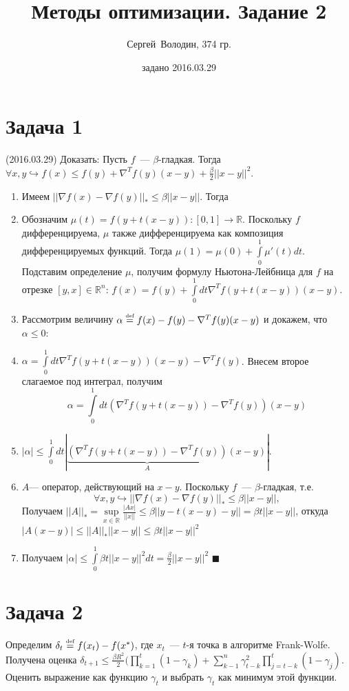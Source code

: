 \documentclass[a4paper]{article}
\title{Методы оптимизации. Задание 2}
\date{задано 2016.03.29}
\author{Сергей~Володин, 374 гр.}
\def\eqdef{\overset{\mbox{\tiny def}}{=}}
\begin{document}
\maketitle
\section*{Задача 1}
(2016.03.29)
Доказать: Пусть $f$~--- $\beta$-гладкая. Тогда $\forall x,y \hookrightarrow f(x)\leqslant f(y)+\nabla^Tf(y)(x-y)+\frac{\beta}{2}||x-y||^2$.

\begin{enumerate}
	\item Имеем $||\nabla f(x)-\nabla f(y)||_*\leqslant \beta ||x-y||$. Тогда 
	\item Обозначим $\mu(t)=f(y+t(x-y))\colon [0,1]\to\mathbb{R}$. Поскольку $f$ дифференцируема, $\mu$ также дифференцируема как композиция дифференцируемых функций. Тогда $\mu(1)=\mu(0)+\int\limits_0^1\mu'(t)dt$. Подставим определение $\mu$, получим формулу Ньютона-Лейбница для $f$ на отрезке $[y,x]\in\mathbb{R}^n$: $f(x)=f(y)+\int\limits_0^1 dt \nabla^Tf(y+t(x-y))(x-y)$.
	\item Рассмотрим величину $\alpha\eqdef f(x)-f(y)-\nabla^Tf(y)(x-y)$ и докажем, что $\alpha\leqslant 0$:
	\item $\alpha=\int\limits_0^1 dt \nabla^Tf(y+t(x-y))(x-y)-\nabla^Tf(y)$. Внесем второе слагаемое под интеграл, получим
	$$\alpha=\int\limits_0^1 dt \left(\nabla^T f(y+t(x-y))-\nabla^T f(y)\right)(x-y)$$
	\item $|\alpha|\leqslant\int\limits_0^1 dt |\underbrace{\left(\nabla^T f(y+t(x-y))-\nabla^T f(y)\right)}_{A}(x-y)|$.
	\item $A$--- оператор, действующий на $x-y$. Поскольку $f$~--- $\beta$-гладкая, т.е. $$\forall x,y\hookrightarrow ||\nabla f(x) - \nabla f(y)||_*\leqslant \beta ||x-y||,$$
	Получаем $||A||_*=\sup\limits_{x\in\mathbb{R}}\frac{|Ax|}{||x||}\leqslant \beta ||y-t(x-y)-y||=\beta t ||x-y||$, откуда $|A(x-y)|\leqslant ||A||_*||x-y||\leqslant \beta t||x-y||^2$
	\item Получаем $|\alpha|\leqslant \int\limits_0^1 \beta t ||x-y||^2 dt = \frac{\beta}{2}||x-y||^2$ $\blacksquare$
\end{enumerate}
\section*{Задача 2}
Определим $\delta_t\eqdef f(x_t)-f(x^*)$, где $x_t$~--- $t$-я точка в алгоритме Frank-Wolfe. Получена оценка $\delta_{t+1}\leqslant \frac{\beta R^2}{2}(\prod\limits_{k=1}^t(1-\gamma_k)+\sum\limits_{k-1}^n\gamma^2_{t-k}\prod\limits_{j=t-k}^t(1-\gamma_j)$. Оценить выражение как функцию $\gamma_t$ и выбрать $\gamma_t$ как минимум этой функции.
\end{document}
